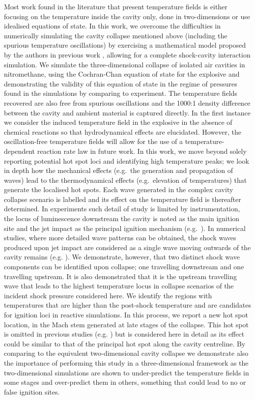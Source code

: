 \documentclass[3p,times,twocolumn]{elsarticle}
\begin{document}
Most work found in the literature that present temperature fields is either focusing on the temperature inside the cavity only, done in two-dimensions or use idealised equations of state. In this work, we overcome the difficulties in numerically simulating the cavity collapse mentioned above (including the spurious temperature oscillations) by exercising a mathematical model proposed by the authors in previous work \cite{michael2016hybrid}, allowing for a complete shock-cavity interaction simulation.  We simulate the three-dimensional collapse of isolated air cavities in nitromethane, using the Cochran-Chan equation of state for the explosive and demonstrating the validity of this equation of state in the regime of pressures found in the simulations by comparing to experiment. The temperature fields recovered are also free from spurious oscillations and the 1000:1 density difference between the cavity and ambient material is captured directly. In the first instance we consider the induced temperature field in the explosive in the absence of chemical reactions so that hydrodynamical effects are elucidated. However, the oscillation-free temperature fields will allow for the use of a temperature-dependent reaction rate law in future work. In this work, we move beyond solely reporting potential hot spot loci and identifying high temperature peaks; we look in depth how the mechanical effects (e.g.\ the generation and propagation of waves) lead to the thermodynamical effects (e.g.\ elevation of temperatures) that generate the localised hot spots. Each wave generated in the complex cavity collapse scenario is labelled and its effect on the temperature field is thereafter determined. In experiments such detail of study is limited by instrumentation, the locus of luminescence downstream the cavity is noted as the main ignition site and the jet impact as the principal ignition mechanism (e.g.\ \cite{bourne1992shock,bourne1991bubble,bourne1999explosive}). In numerical studies, where more detailed wave patterns can be obtained, the shock waves produced upon jet impact are considered as a single wave moving outwards of the cavity remains (e.g. \cite{bourne2002cavity}). We demonstrate, however, that two distinct shock wave components can be identified upon collapse; one travelling downstream and one travelling upstream. It is also demonstrated that it is the upstream travelling wave that leads to the highest temperature locus in collapse scenarios of the incident shock pressure considered here. We identify the regions with temperatures that are higher than the post-shock temperature and are candidates for ignition loci in reactive simulations. In this process, we report a new hot spot location, in the Mach stem generated at late stages of the collapse. This hot spot is omitted in previous studies  (e.g. \cite{bourne2002cavity}) but is considered here in detail as its effect could be similar to that of the principal hot spot along the cavity centreline.  By comparing to the equivalent two-dimensional cavity collapse we demonstrate also the importance of performing this study in a three-dimensional framework as the two-dimensional simulations are shown to under-predict the temperature fields in some stages and over-predict them in others, something that could lead to no or false ignition sites. 
\end{document}
